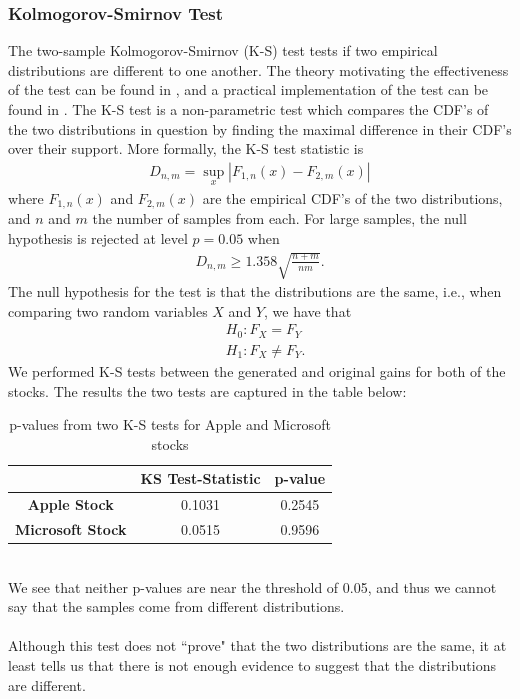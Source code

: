 \documentclass{article}
\theoremstyle{definition}
\begin{document}
\subsubsection{Kolmogorov-Smirnov Test}
The two-sample Kolmogorov-Smirnov (K-S) test tests if two empirical distributions are different to one another. The theory motivating the effectiveness of the test can be found in \cite{mit_ks_test}, and a practical implementation of the test can be found in \cite{bolen2024kolmogorov}. The K-S test is a non-parametric test which compares the CDF's of the two distributions in question by finding the maximal difference in their CDF's over their support. More formally, the K-S test statistic is
\begin{align}
    D_{n,m} = \underset{x}{\sup} \left|F_{1,n}(x)-F_{2,m}(x)\right|
\end{align}
where $F_{1,n}(x)$ and $F_{2,m}(x)$ are the empirical CDF's of the two distributions, and $n$ and $m$ the number of samples from each. For large samples, the null hypothesis is rejected at level $p=0.05$ when
\begin{align}
    D_{n,m} \geq 1.358 \sqrt{\frac{n+m}{n m}}.
\end{align}
The null hypothesis for the test is that the distributions are the same, i.e., when comparing two random variables $X$ and $Y$, we have that
\begin{align*}
    &H_0: F_X = F_Y\\
    &H_1: F_X \neq F_Y.
\end{align*}
We performed K-S tests between the generated and original gains for both of the stocks. The results the two tests are captured in the table below:
\begin{table}[h!]
    \centering
    \begin{tabular}{|c|c|c|}
        \hline
        & \textbf{KS Test-Statistic} & \textbf{p-value} \\ 
        \hline
        \textbf{Apple Stock} & 0.1031 & 0.2545 \\ 
        \hline
        \textbf{Microsoft Stock} & 0.0515 & 0.9596 \\
        \hline
    \end{tabular}
    \caption{p-values from two K-S tests for Apple and Microsoft stocks}
\end{table}\\
\noindent
We see that neither p-values are near the threshold of 0.05, and thus we cannot say that the samples come from different distributions. 
\\\\
Although this test does not ``prove" that the two distributions are the same, it at least tells us that there is not enough evidence to suggest that the distributions are different.
\end{document}
